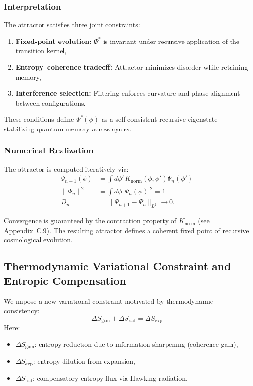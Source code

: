 \subsubsection*{Interpretation}

The attractor satisfies three joint constraints:
\begin{enumerate}
  \item \textbf{Fixed-point evolution:} \( \Psi^* \) is invariant under recursive application of the transition kernel,
  \item \textbf{Entropy–coherence tradeoff:} Attractor minimizes disorder while retaining memory,
  \item \textbf{Interference selection:} Filtering enforces curvature and phase alignment between configurations.
\end{enumerate}

These conditions define \( \Psi^*(\phi) \) as a self-consistent recursive eigenstate stabilizing quantum memory across cycles.

\subsubsection*{Numerical Realization}

The attractor is computed iteratively via:
\begin{align}
\Psi_{n+1}(\phi) &= \int d\phi' \, K_{\text{norm}}(\phi, \phi') \Psi_n(\phi') \\
\|\Psi_n\|^2 &= \int d\phi \, |\Psi_n(\phi)|^2 = 1 \\
D_n &= \| \Psi_{n+1} - \Psi_n \|_{L^2} \to 0.
\end{align}

Convergence is guaranteed by the contraction property of \( K_{\text{norm}} \) (see Appendix~C.9). The resulting attractor defines a coherent fixed point of recursive cosmological evolution.
\subsection*{Thermodynamic Variational Constraint and Entropic Compensation}
\label{appendix:C8}

We impose a new variational constraint motivated by thermodynamic consistency:
\begin{equation}
\Delta S_{\text{gain}} + \Delta S_{\text{rad}} = \Delta S_{\text{exp}}
\end{equation}
Here:
\begin{itemize}
  \item \( \Delta S_{\text{gain}} \): entropy reduction due to information sharpening (coherence gain),
  \item \( \Delta S_{\text{exp}} \): entropy dilution from expansion,
  \item \( \Delta S_{\text{rad}} \): compensatory entropy flux via Hawking radiation.
\end{itemize}

